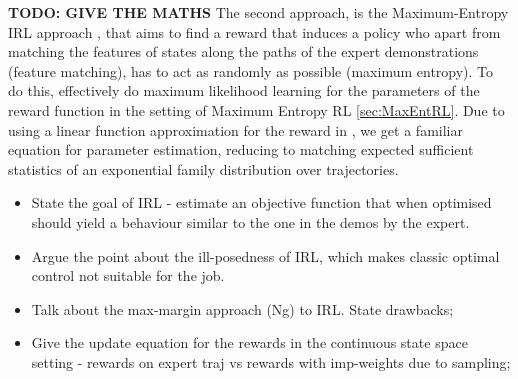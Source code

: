 \documentclass{report}
\numberwithin{equation}{section}
\numberwithin{figure}{section}
\numberwithin{table}{section}
\numberwithin{algorithm}{section}
\begin{document}
\textbf{TODO: GIVE THE MATHS}
The second approach, is the Maximum-Entropy IRL approach 
\citep{Ziebart2008}, that aims to find a reward that induces 
a policy who apart from matching the features of 
states along the paths of the expert demonstrations (feature 
matching), has 
to act as randomly as possible (maximum entropy). To do this, 
\cite{Ziebart2008} effectively do maximum likelihood learning 
for the parameters of the reward function in the setting of 
Maximum Entropy RL \ref{sec:MaxEntRL}. Due to using a linear 
function approximation for the reward in \cite{Ziebart2008}, 
we get a familiar equation for parameter estimation, reducing 
to matching expected sufficient statistics of an exponential 
family distribution over trajectories. 



\begin{itemize}
  \item State the goal of IRL - estimate an objective function
    that when optimised should yield a behaviour similar to the 
    one in the demos by the expert.
  \item Argue the point about the ill-posedness of IRL, which makes 
    classic optimal control not suitable for the job.
  \item Talk about the max-margin approach (Ng) to IRL.
    State drawbacks;
  \item Give the update equation for the rewards in the 
  continuous state space setting - rewards on expert traj 
  vs rewards with imp-weights due to sampling;
\end{itemize}
\end{document}
